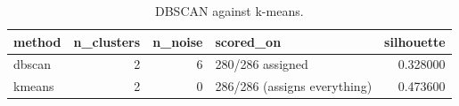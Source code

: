 \begin{table}
\caption{DBSCAN against k-means.}
\label{tab:dbscan:results}
\begin{tabular}{lrrlr}
\toprule
method & n_clusters & n_noise & scored_on & silhouette \\
\midrule
dbscan & 2 & 6 & 280/286 assigned & 0.328000 \\
kmeans & 2 & 0 & 286/286 (assigns everything) & 0.473600 \\
\bottomrule
\end{tabular}
\end{table}
